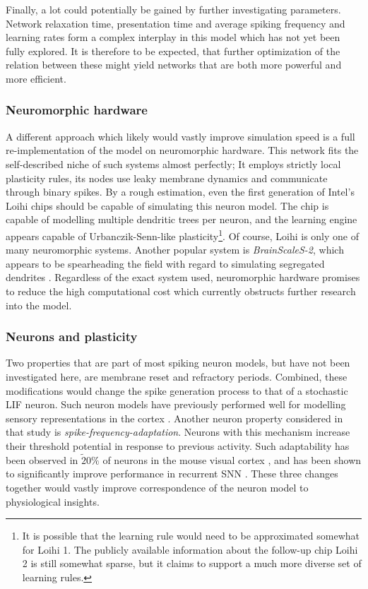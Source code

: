 Finally, a lot could potentially be gained by further investigating parameters. Network relaxation time, presentation
time and average spiking frequency and learning rates form a complex interplay in this model which has not yet been fully
explored. It is therefore to be expected, that further optimization of the relation between these might yield networks
that are both more powerful and more efficient.


\subsubsection*{Neuromorphic hardware}

A different approach which likely would vastly improve simulation speed is a full re-implementation of the model on
neuromorphic hardware. This network fits the self-described niche of such systems almost perfectly; It employs strictly
local plasticity rules, its nodes use leaky membrane dynamics and communicate through binary spikes. By a rough
estimation, even the first generation of Intel's Loihi chips \citep{davies2018loihi} should be capable of simulating
this neuron model. The chip is capable of modelling multiple dendritic trees per neuron, and the learning engine appears
capable of Urbanczik-Senn-like plasticity\footnote{It is possible that the learning rule would need to be approximated
somewhat for Loihi 1. The publicly available information about the follow-up chip Loihi 2 \citep{Davies2021} is still
somewhat sparse, but it claims to support a much more diverse set of learning rules.}. Of course, Loihi is only one of
many neuromorphic systems. Another popular system is \textit{BrainScaleS-2}, which appears to be spearheading the field
with regard to simulating segregated dendrites \citep{Kaiser2022}. Regardless of the exact system used, neuromorphic
hardware promises to reduce the high computational cost which currently obstructs further research into the model.


\subsubsection*{Neurons and plasticity}

Two properties that are part of most spiking neuron models, but have not been investigated here, are membrane reset and
refractory periods. Combined, these modifications would change the spike generation process to that of a stochastic LIF
neuron. Such neuron models have previously performed well for modelling sensory representations in the cortex
\citep{Pillow2008}. Another neuron property considered in that study is \textit{spike-frequency-adaptation}. Neurons
with this mechanism increase their threshold potential in response to previous activity. Such adaptability has been
observed in $\tilde 20 \% $ of neurons in the mouse visual cortex \citep{allen2018}, and has been shown to significantly
improve performance in recurrent SNN \citep{bellec2018long,bellec2020solution}. These three changes together would
vastly improve correspondence of the neuron model to physiological insights.

